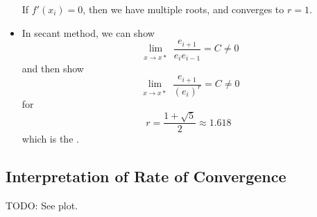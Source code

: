 \begin{itemize}
          \begin{remark}
              If \( f'(x_i) = 0 \), then we have multiple roots, and converges to \( r = 1 \).
          \end{remark}

    \item In secant method, we can show \[
              \lim_{\substack{x \to x\ast}} \frac{e_{i+1}}{e_i e_{i-1}} = C \neq 0
          \] and then show \[
              \lim_{\substack{x \to x\ast}} \frac{e_{i+1}}{(e_i)^r} = C \neq 0
          \] for \[
              r = \frac{1 + \sqrt{5}}{2} \approx 1.618
          \] which is the .
\end{itemize}

\subsection{Interpretation of Rate of Convergence}

TODO: See plot.